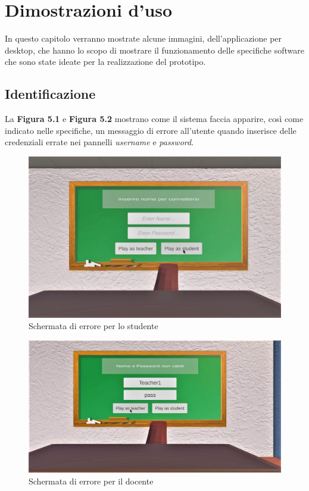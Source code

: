 \chapter{Dimostrazioni d'uso}
In questo capitolo verranno mostrate alcune immagini, dell'applicazione per desktop, che hanno lo scopo di mostrare il funzionamento delle specifiche software che sono state ideate per la realizzazione del prototipo.
\section{Identificazione}
La \textbf{Figura 5.1} e \textbf{Figura 5.2} mostrano come il sistema faccia apparire, così come indicato nelle specifiche, un messaggio di errore all'utente quando inserisce delle credenziali errate nei pannelli \textit{username} e \textit{password}.
\begin{figure}[H]
\centering
\includegraphics[scale = 0.3]{Immagini/Dimostrazioni d'uso/loginstuderr.jpg}
\caption{Schermata di errore per lo studente}
\end{figure}
\begin{figure}[H]
\centering
\includegraphics[scale = 0.3]{Immagini/Dimostrazioni d'uso/loginteacherr.jpg}
\caption{Schermata di errore per il docente}
\end{figure}
